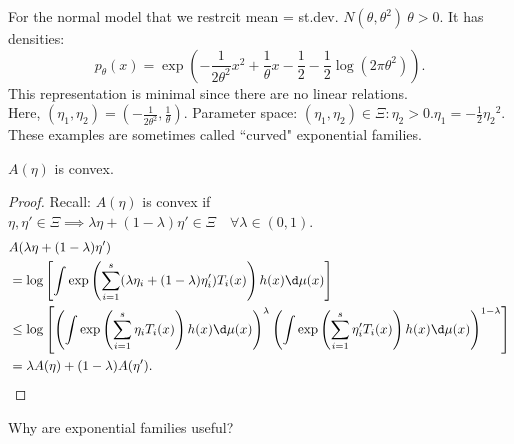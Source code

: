 \documentclass[a4paper]{article}
\begin{document}
\begin{eg}
	For the normal model that we restrcit mean = st.dev. $N(\theta, {\theta}^2) \ \theta > 0$. It has densities:
	\begin{equation*}
		p_{\theta} (x) = \exp \left(-\frac{1}{2{\theta}^2} x^2 + \frac{1}{\theta} x - \frac{1}{2} - \frac{1}{2} \log(2 \pi {\theta}^2)\right).
	\end{equation*}
	This representation is minimal since there are no linear relations. \\ Here, $(\eta_1, \eta_2) = (-\frac{1}{2{\theta}^2}, \frac{1}{\theta})$. Parameter space: ${\left(\eta_1, \eta_2\right) \in \Xi: \eta_2 > 0. \eta_1 = - \frac{1}{2} {\eta_2}^2}$. \\ These examples are sometimes called ``curved" exponential families.
\end{eg}

\begin{prop}
	$A(\eta)$ is convex.
\end{prop}

\begin{proof}
	Recall: $A(\eta)$ is convex if $\eta, \eta' \in \Xi \implies \lambda \eta + (1-\lambda) \eta' \in \Xi \quad \forall \lambda \in (0,1)$.\\
	\begin{equation}
		\begin{aligned}
			&A(\lambda \eta + (1-\lambda) \eta') \\
			&= \log\left[\int \exp \left(\sum\limits_{i = 1}^s(\lambda \eta_i + (1-\lambda) \eta_i')T_i (x)\right)h(x) \d \mu (x)\right] \\
			&\leq \log\left[\left(\int \exp\left(\sum\limits_{i = 1}^s \eta_i T_i(x)\right) h(x) \d \mu (x)\right)^{\lambda} \left(\int \exp\left(\sum\limits_{i = 1}^s \eta_i' T_i (x)\right) h(x) \d \mu (x)\right)^{1 - \lambda}\right] \\
			&= \lambda A(\eta) + (1-\lambda) A(\eta').
		\end{aligned}
	\end{equation}
\end{proof}

\begin{question}
	Why are exponential families useful?
\end{question}
\end{document}
